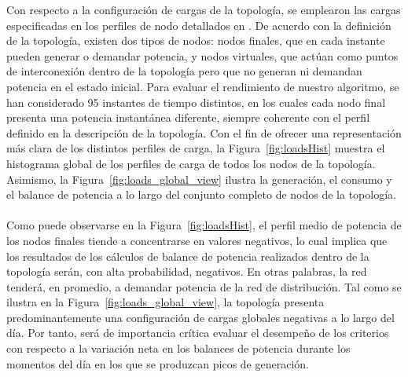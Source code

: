 Con respecto a la configuración de cargas de la topología, se emplearon las cargas especificadas en los perfiles de nodo detallados en \cite{Schneider17}. De acuerdo con la definición de la topología, existen dos tipos de nodos: nodos finales, que en cada instante pueden generar o demandar potencia, y nodos virtuales, que actúan como puntos de interconexión dentro de la topología pero que no generan ni demandan potencia en el estado inicial. Para evaluar el rendimiento de nuestro algoritmo, se han considerado 95 instantes de tiempo distintos, en los cuales cada nodo final presenta una potencia instantánea diferente, siempre coherente con el perfil definido en la descripción de la topología. Con el fin de ofrecer una representación más clara de los distintos perfiles de carga, la Figura~\ref{fig:loadsHist} muestra el histograma global de los perfiles de carga de todos los nodos de la topología. Asimismo, la Figura~\ref{fig:loads_global_view} ilustra la generación, el consumo y el balance de potencia a lo largo del conjunto completo de nodos de la topología.\\
\\
Como puede observarse en la Figura~\ref{fig:loadsHist}, el perfil medio de potencia de los nodos finales tiende a concentrarse en valores negativos, lo cual implica que los resultados de los cálculos de balance de potencia realizados dentro de la topología serán, con alta probabilidad, negativos. En otras palabras, la red tenderá, en promedio, a demandar potencia de la red de distribución. Tal como se ilustra en la Figura~\ref{fig:loads_global_view}, la topología presenta predominantemente una configuración de cargas globales negativas a lo largo del día. Por tanto, será de importancia crítica evaluar el desempeño de los criterios con respecto a la variación neta en los balances de potencia durante los momentos del día en los que se produzcan picos de generación.

